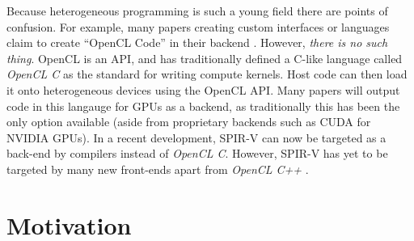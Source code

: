 \documentclass[a4paper,12pt,twoside,openright]{report}
\begin{document}
\begin{itemize}


\end{itemize}


Because heterogeneous programming is such a young field there are points of
confusion. For example, many papers creating custom interfaces or languages
claim to create ``OpenCL Code'' in their backend \cite{JITGPU} \cite{Lime2012}.
However, \textit{there is no such thing}. OpenCL is an API, and has
traditionally defined a C-like language called \textit{OpenCL C} as the
standard for writing compute kernels. Host code can then load it onto
heterogeneous devices using the OpenCL API. Many papers will output code in
this langauge for GPUs as a backend, as traditionally this has been the only
option available (aside from proprietary backends such as CUDA for NVIDIA
GPUs). In a recent development, SPIR-V can now be targeted as a back-end by
compilers instead of \textit{OpenCL C}. However, SPIR-V has yet to be targeted
by many new front-ends apart from \textit{OpenCL C++}
\cite{OpenCLCPPWhitePaper}.

\section{Motivation}


\end{document}
